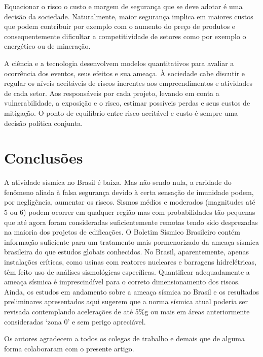 \documentclass[jgrga]{agutex}
\begin{document}
\begin{article}
Equacionar o risco o custo e margem de segurança que se deve adotar é uma decisão da sociedade. Naturalmente, maior segurança implica em maiores custos que podem contribuir por exemplo com o aumento do preço de produtos e consequentemente dificultar a competitividade de setores como por exemplo o energético ou de mineração. 

A ciência e a tecnologia desenvolvem modelos quantitativos para avaliar a ocorrência dos eventos, seus efeitos e sua ameaça. À sociedade cabe discutir e regular os níveis aceitáveis de riscos inerentes aos empreendimentos e atividades de cada setor. Aos responsáveis por cada projeto, levando em conta a vulnerabilidade, a exposição e o risco, estimar possíveis perdas e seus custos de mitigação. O ponto de equilíbrio entre risco aceitável e custo é sempre uma decisão política conjunta.

\section{Conclusões}

A atividade sísmica no Brasil é baixa. Mas não sendo nula, a raridade do fenômeno aliada à falsa segurança devido à certa sensação de imunidade podem, por negligência, aumentar os riscos. Sismos médios e moderados (magnitudes até 5 ou 6) podem ocorrer em qualquer região mas com probabilidades tão pequenas que até agora foram consideradas suficientemente remotas tendo sido desprezadas na maioria dos projetos de edificações. O Boletim Sísmico Brasileiro \citep{bsb_2014} contém informação suficiente para um tratamento mais pormenorizado da ameaça sísmica brasileira do que estudos globais conhecidos. No Brasil, aparentemente, apenas instalações críticas, como usinas com reatores nucleares e barragens hidrelétricas, têm feito uso de análises sismológicas específicas. Quantificar adequadamente a ameaça sísmica é imprescindível para o correto dimensionamento dos riscos. Ainda, os estudos em andamento sobre a ameaça sísmica no Brasil e os resultados preliminares apresentados aqui sugerem que a norma sísmica atual poderia ser revisada contemplando acelerações de até 5\%g ou mais em áreas anteriormente consideradas `zona 0' e sem perigo apreciável.

\begin{acknowledgments}
Os autores agradecem a todos os colegas de trabalho e demais que de alguma forma colaboraram com o presente artigo.
\end{acknowledgments}



\end{article}
\end{document}
